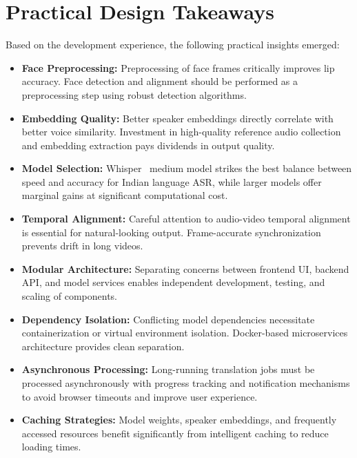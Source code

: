 \documentclass[12pt,oneside]{report}
\begin{document}
\section{Practical Design Takeaways}

Based on the development experience, the following practical insights emerged:

\begin{itemize}
    \item \textbf{Face Preprocessing:} Preprocessing of face frames critically improves lip accuracy. Face detection and alignment should be performed as a preprocessing step using robust detection algorithms.
    
    \item \textbf{Embedding Quality:} Better speaker embeddings directly correlate with better voice similarity. Investment in high-quality reference audio collection and embedding extraction pays dividends in output quality.
    
    \item \textbf{Model Selection:} Whisper~\cite{radford2023whisper} medium model strikes the best balance between speed and accuracy for Indian language ASR, while larger models offer marginal gains at significant computational cost.
    
    \item \textbf{Temporal Alignment:} Careful attention to audio-video temporal alignment is essential for natural-looking output. Frame-accurate synchronization prevents drift in long videos.
    
    \item \textbf{Modular Architecture:} Separating concerns between frontend UI, backend API, and model services enables independent development, testing, and scaling of components.
    
    \item \textbf{Dependency Isolation:} Conflicting model dependencies necessitate containerization or virtual environment isolation. Docker-based microservices architecture provides clean separation.
    
    \item \textbf{Asynchronous Processing:} Long-running translation jobs must be processed asynchronously with progress tracking and notification mechanisms to avoid browser timeouts and improve user experience.
    
    \item \textbf{Caching Strategies:} Model weights, speaker embeddings, and frequently accessed resources benefit significantly from intelligent caching to reduce loading times.
    

\end{itemize}
\end{document}
